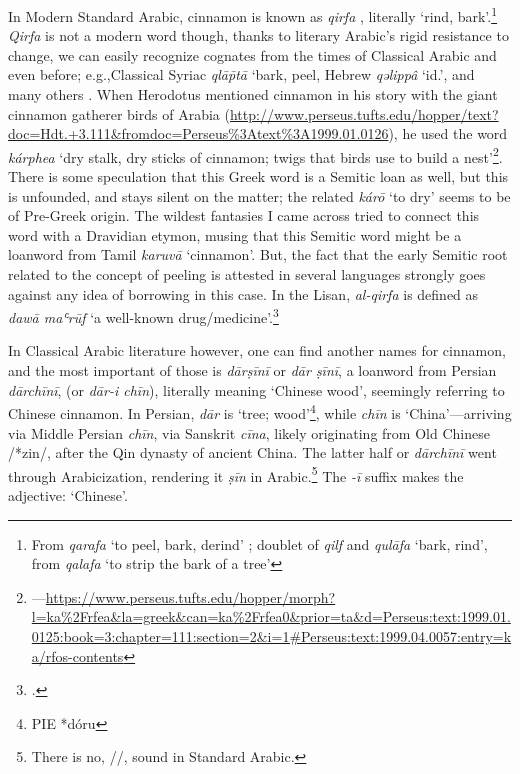 In Modern Standard Arabic, cinnamon is known as 
\textit{qirfa} , literally `rind, bark'.\footnote{From \textit{qarafa} `to peel, bark, derind' ; doublet of \textit{qilf} and \textit{qulāfa} `bark, rind', from \textit{qalafa} `to strip the bark of a tree' } \textit{Qirfa} is not a modern word though, thanks to literary Arabic's rigid resistance to change, we can easily recognize cognates from the times of Classical Arabic and even before; e.g.,Classical Syriac  \textit{qlāp̄tā} `bark, peel, Hebrew  \textit{qəlippâ} `id.', and many others \parencite[see][427]{leslau_comparative_1991}.
When Herodotus mentioned cinnamon in his story with the giant cinnamon gatherer birds of Arabia (\href{3.111}{http://www.perseus.tufts.edu/hopper/text?doc=Hdt.+3.111\&fromdoc=Perseus\%3Atext\%3A1999.01.0126}), he used the word  \textit{kárphea} `dry stalk, dry sticks of cinnamon; twigs that birds use to build a nest'\footnote{---\url{https://www.perseus.tufts.edu/hopper/morph?l=ka\%2Frfea\&la=greek\&can=ka\%2Frfea0\&prior=ta\&d=Perseus:text:1999.01.0125:book=3:chapter=111:section=2\&i=1\#Perseus:text:1999.04.0057:entry=ka/rfos-contents}}. There is some speculation that this Greek word is a Semitic loan as well, but this is unfounded, and \textcite{beekes_etymological_2010} stays silent on the matter; the related \textit{kárō} `to dry' seems to be of Pre-Greek origin. The wildest fantasies I came across tried to connect this word with a Dravidian etymon, musing that this Semitic word might be a loanword from Tamil  \textit{karuvā} `cinnamon'.
But, the fact that the early Semitic root related to the concept of peeling is attested in several languages strongly goes against any idea of borrowing in this case. In the \gls{Lisan}, \textit{al-qirfa} is defined as \textit{daw\={a} maʿr\={u}f} `a well-known drug/medicine'.\footcite[3599 ]{ibn_manzur_lisan_1979}



In Classical Arabic literature however, one can find another names for cinnamon, and the most important of those is  
\textit{dārṣīnī} or  
\textit{dār ṣīnī}, a loanword from Persian 
\textit{dārchīnī}, (or  
\textit{dār-i chīn}), literally meaning `Chinese wood', seemingly referring to Chinese cinnamon. In Persian, \textit{dār} is `tree; wood'\footnote{\gls{PIE} *dóru}, while \textit{chīn} is `China'---arriving via Middle Persian \textit{chīn}, via Sanskrit  \textit{cīna}, likely originating from Old Chinese  /*zin/, after the Qin dynasty of ancient China. The latter half or \textit{dārchīnī} went through Arabicization, rendering it \textit{ṣīn} in Arabic.\footnote{There is no, /\textipa{\t{\textteshlig}}/, sound in Standard Arabic.} The \textit{-ī} suffix makes the adjective: `Chinese'. 

